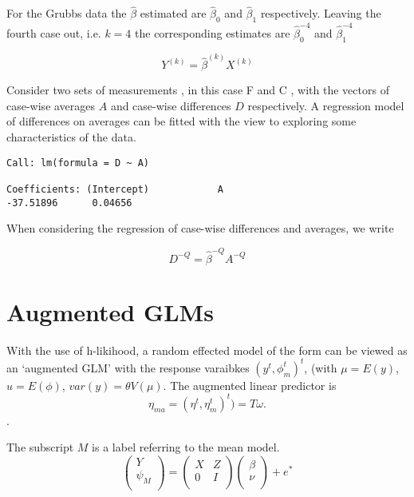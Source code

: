 \documentclass[12pt, a4paper]{article}
\begin{document}
For the Grubbs data the $\hat{\beta}$ estimated are $\hat{\beta}_{0}$ and $\hat{\beta}_{1}$ respectively. Leaving the
fourth case out, i.e. $k=4$ the corresponding estimates are $\hat{\beta}_{0}^{-4}$ and $\hat{\beta}_{1}^{-4}$

\begin{equation}
Y^{(k)} = \hat{\beta}^{(k)}X^{(k)}
\end{equation}

Consider two sets of measurements , in this case F and C , with the vectors of case-wise averages $A$ and case-wise differences $D$ respectively. A regression model of differences on averages can be fitted with the view to exploring some characteristics of the data.

\begin{verbatim}
Call: lm(formula = D ~ A)

Coefficients: (Intercept)            A
-37.51896      0.04656

\end{verbatim}




When considering the regression of case-wise differences and averages, we write

\begin{equation}
D^{-Q} = \hat{\beta}^{-Q}A^{-Q}
\end{equation}






\section{Augmented GLMs} %

With the use of h-likihood, a random effected model of the form can be viewed as an `augmented GLM' with the response varaibkes $(y^t, \phi^t_m)^t$, (with $\mu = E(y)$,$ u = E(\phi)$, $var(y) = \theta V (\mu)$.
The augmented linear predictor is \[\eta_{ma}  = (\eta^t, \eta^t_m)^t) = T\omega. \].




The subscript $M$ is a label referring to the mean model.
\begin{equation}
\left(%
\begin{array}{c}
Y \\
\psi_{M} \\
\end{array}%
\right) = \left(
\begin{array}{cc}
X & Z \\
0 & I \\
\end{array}\right) \left(%
\begin{array}{c}
\beta \\
\nu \\
\end{array}%
\right)+ e^{*}
\end{equation}
\end{document}

